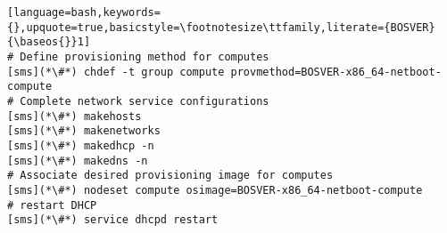 \begin{lstlisting}[language=bash,keywords={},upquote=true,basicstyle=\footnotesize\ttfamily,literate={BOSVER}{\baseos{}}1]
# Define provisioning method for computes
[sms](*\#*) chdef -t group compute provmethod=BOSVER-x86_64-netboot-compute
# Complete network service configurations
[sms](*\#*) makehosts
[sms](*\#*) makenetworks
[sms](*\#*) makedhcp -n
[sms](*\#*) makedns -n
# Associate desired provisioning image for computes
[sms](*\#*) nodeset compute osimage=BOSVER-x86_64-netboot-compute
# restart DHCP
[sms](*\#*) service dhcpd restart
\end{lstlisting}

